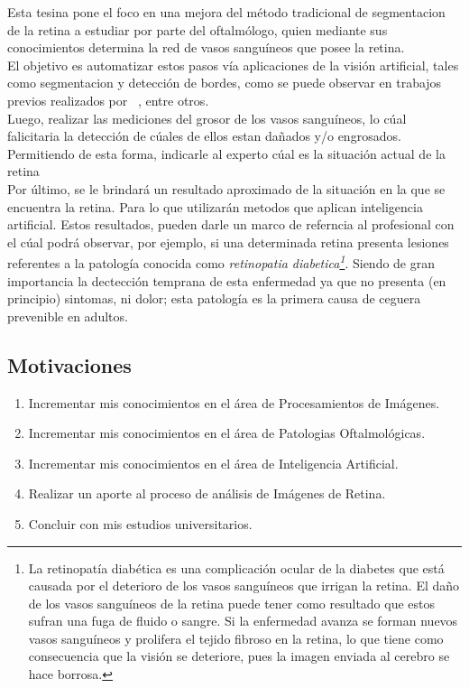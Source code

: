 \documentclass[14pt]{article}
\begin{document}
Esta tesina pone el foco en una mejora del método tradicional de segmentacion de la retina a estudiar por parte del oftalmólogo,
quien mediante sus conocimientos determina la red de vasos sanguíneos que posee la retina.\\[0.5cm]
El objetivo es automatizar estos pasos vía aplicaciones de la visión artificial, tales como segmentacion y 
detección de bordes,  como se puede observar en trabajos previos realizados por ~\cite{Gambini2006},  entre otros.\\[0.5cm]
Luego, realizar las mediciones del grosor de los vasos sanguíneos, lo cúal falicitaria la detección de cúales de ellos estan dañados y/o engrosados. Permitiendo de esta forma, indicarle al experto cúal es la situación actual de la retina\\[0.5cm]
Por último, se le brindará un resultado aproximado de la situación en la que se encuentra la retina. Para lo que utilizarán metodos que aplican inteligencia artificial.
Estos resultados, pueden darle un marco de referncia al profesional con el cúal podrá observar, por ejemplo, si una determinada retina presenta lesiones referentes a la patología conocida como \textit{retinopatia diabetica\footnote{La retinopatía diabética es una complicación ocular de la diabetes que está causada por el deterioro de los vasos sanguíneos que irrigan la retina. El daño de los vasos sanguíneos de la retina puede tener como resultado que estos sufran una fuga de fluido o sangre. Si la enfermedad avanza se forman nuevos vasos sanguíneos y prolifera el tejido fibroso en la retina, lo que tiene como consecuencia que la visión se deteriore, pues la imagen enviada al cerebro se hace borrosa.}}. Siendo de gran importancia la dectección temprana de esta enfermedad ya que no presenta (en principio) sintomas, ni dolor; esta patología es la primera causa de ceguera prevenible en adultos.





\subsection{Motivaciones}


\begin{enumerate}
	
	\item Incrementar mis conocimientos en el área de Procesamientos de Imágenes.
	\item Incrementar mis conocimientos en el área de Patologias Oftalmológicas.
	\item Incrementar mis conocimientos en el área de Inteligencia Artificial.
	\item Realizar un aporte al proceso de análisis de Imágenes de Retina.
	\item Concluir con mis estudios universitarios.
\end{enumerate}
\end{document}
